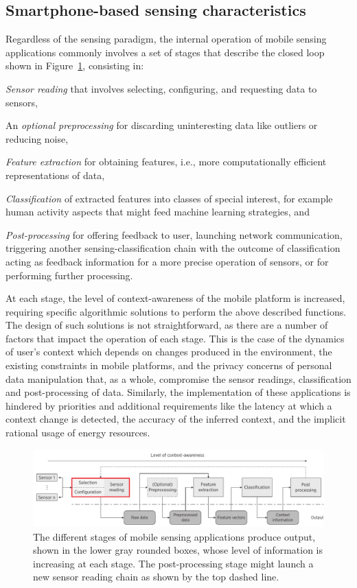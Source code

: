 \documentclass[ENG,PhD]{cinvestav}
\begin{document}
\subsection{Smartphone-based sensing characteristics}
Regardless of the sensing paradigm, the internal operation of mobile sensing applications commonly involves a set of stages that describe the closed loop shown in Figure~\ref{fig:stages-of-power-aware-mobile-sensing}, consisting in:
\begin{listahorizontal}
  \item \emph{Sensor reading} that involves selecting, configuring, and requesting data to sensors,
  \item An \emph{optional preprocessing} for discarding uninteresting data like outliers or reducing noise,
  \item \emph{Feature extraction} for obtaining features, i.e., more computationally efficient representations of data,
  \item \emph{Classification} of extracted features into classes of special interest, for example human activity aspects that might feed machine learning strategies, and
  \item \emph{Post-processing} for offering feedback to user, launching network communication, triggering another sensing-classification chain with the outcome of classification acting as feedback information for a more precise operation of sensors, or for performing further processing.
\end{listahorizontal}
At each stage, the level of context-awareness of the mobile platform is increased, requiring specific algorithmic solutions to perform the above described functions.
The design of such solutions is not straightforward, as there are a number of factors that impact the operation of each stage.
This is the case of the dynamics of user's context which depends on changes produced in the environment, the existing constraints in mobile platforms, and the privacy concerns of personal data manipulation that, as a whole, compromise the sensor readings, classification and post-processing of data.
Similarly, the implementation of these applications is hindered by priorities and additional requirements like the latency at which a context change is detected, the accuracy of the inferred context, and the implicit rational usage of energy resources.
\begin{figure}[t]
    \centering
    \includegraphics[width=\textwidth]{msa-stages}
    \caption{The different stages of mobile sensing applications produce output, shown in the lower gray rounded boxes, whose level of information is increasing at each stage. The post-processing stage might launch a new sensor reading chain as shown by the top dashed line.}
    \label{fig:stages-of-power-aware-mobile-sensing}
\end{figure}
\end{document}
